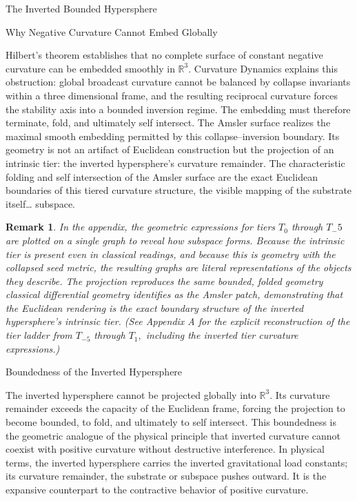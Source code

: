 \documentclass[final,onefignum,onetabnum]{siamart}
\newtheorem{remark}{Remark}
\begin{document}
\begin{section}{The Inverted Bounded Hypersphere}
\begin{subsection}{Why Negative Curvature Cannot Embed Globally}

Hilbert’s theorem establishes that no complete surface of constant negative curvature can be embedded smoothly in $\mathbb{R}^3$. Curvature Dynamics explains this obstruction: global broadcast curvature cannot be balanced by collapse invariants within a three dimensional frame, and the resulting reciprocal curvature forces the stability axis into a bounded inversion regime. The embedding must therefore terminate, fold, and ultimately self intersect.
The Amsler surface realizes the maximal smooth embedding permitted by this collapse–inversion boundary. Its geometry is not an artifact of Euclidean construction but the projection of an intrinsic tier: the inverted hypersphere’s curvature remainder. The characteristic folding and self intersection of the Amsler surface are the exact Euclidean boundaries of this tiered curvature structure, the visible mapping of the substrate itself… subspace.

\begin{remark}
In the appendix, the geometric expressions for tiers $T_0$ through $T_-5$ are plotted on a single graph to reveal how subspace forms. Because the intrinsic tier is present even in classical readings, and because this is geometry with the collapsed seed metric, the resulting graphs are literal representations of the objects they describe. The projection reproduces the same bounded, folded geometry classical differential geometry identifies as the Amsler patch, demonstrating that the Euclidean rendering is the exact boundary structure of the inverted hypersphere’s intrinsic tier.
(See Appendix A for the explicit reconstruction of the tier ladder from $T_{-5}$ through $T_1,$ including the inverted tier curvature expressions.)
\end{remark}
\end{subsection}

\begin{subsection}{Boundedness of the Inverted Hypersphere}

The inverted hypersphere cannot be projected globally into $\mathbb{R}^3.$ Its curvature remainder exceeds the capacity of the Euclidean frame, forcing the projection to become bounded, to fold, and ultimately to self intersect. This boundedness is the geometric analogue of the physical principle that inverted curvature cannot coexist with positive curvature without destructive interference. In physical terms, the inverted hypersphere carries the inverted gravitational load constants; its curvature remainder, the substrate or subspace pushes outward. It is the expansive counterpart to the contractive behavior of positive curvature.


\end{subsection}
\end{section}
\end{document}
